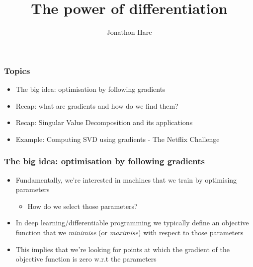 \documentclass[\beamerclass]{beamer}
\title[Differentiation]{The power of differentiation}
\author{Jonathon Hare}
\institute[]
{
  Vision, Learning and Control\\
  University of Southampton 
}
\date{}
\begin{document}
\begin{frame}[plain]
\end{frame}

\frame{
  \titlepage
}

\begin{frame}
\frametitle{Topics}
\begin{itemize}
	\item The big idea: optimisation by following gradients
	\item Recap: what are gradients and how do we find them?
	\item Recap: Singular Value Decomposition and its applications
	\item Example: Computing SVD using gradients - The Netflix Challenge
\end{itemize}
\end{frame}

\begin{frame}
\frametitle{The big idea: optimisation by following gradients}
\begin{itemize}
	\item<+-> Fundamentally, we're interested in machines that we train by optimising parameters
	\begin{itemize}
		\item<+-> How do we select those parameters?
	\end{itemize}
	\item<+-> In deep learning/differentiable programming we typically define an objective function that we \emph{minimise} (or \emph{maximise}) with respect to those parameters
	\item<+-> This implies that we're looking for points at which the gradient of the objective function is zero w.r.t the parameters
\end{itemize}
\end{frame}
\end{document}
